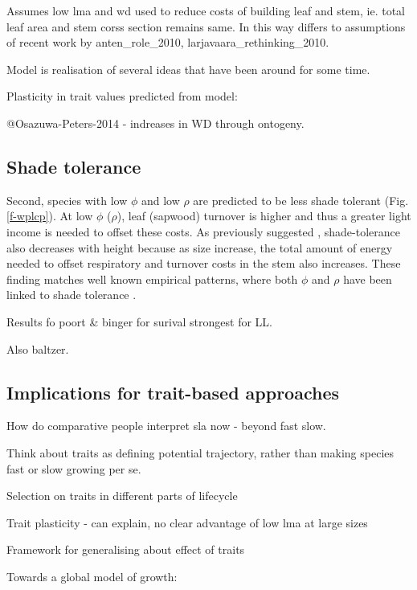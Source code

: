 \documentclass[12pt, a4paper]{article}
\begin{document}
Assumes low lma and wd used to reduce costs of building leaf and stem,
ie. total leaf area and stem corss section remains same. In this way
differs to assumptions of recent work by anten\_role\_2010,
larjavaara\_rethinking\_2010.

Model is realisation of several ideas that have been around for some
time.

Plasticity in trait values predicted from model:

@Osazuwa-Peters-2014 - indreases in WD through ontogeny.

\subsection{Shade tolerance}\label{shade-tolerance}

Second, species with low $\phi$ and low $\rho$ are predicted to be
less shade tolerant (Fig. \ref{f-wplcp}). At low $\phi$ ($\rho$),
leaf (sapwood) turnover is higher and thus a greater light income is
needed to offset these costs. As previously suggested
 \citep{givnish-1988}, shade-tolerance also decreases with
height because as size increase, the total amount of energy needed to
offset respiratory and turnover costs in the stem also increases. These
finding matches well known empirical patterns, where both $\phi$ and
$\rho$ have been linked to shade tolerance \citep{poorter-2006, lusk-2008,osunkoya-1996}.

Results fo poort \& binger for surival strongest for LL.

Also baltzer.

\subsection{Implications for trait-based approaches}\label{implications-for-trait-based-approaches}

How do comparative people interpret sla now - beyond fast slow.

Think about traits as defining potential trajectory, rather than making
species fast or slow growing per se.

Selection on traits in different parts of lifecycle

Trait plasticity - can explain, no clear advantage of low lma at large
sizes

Framework for generalising about effect of traits


Towards a global model of growth:
\end{document}
